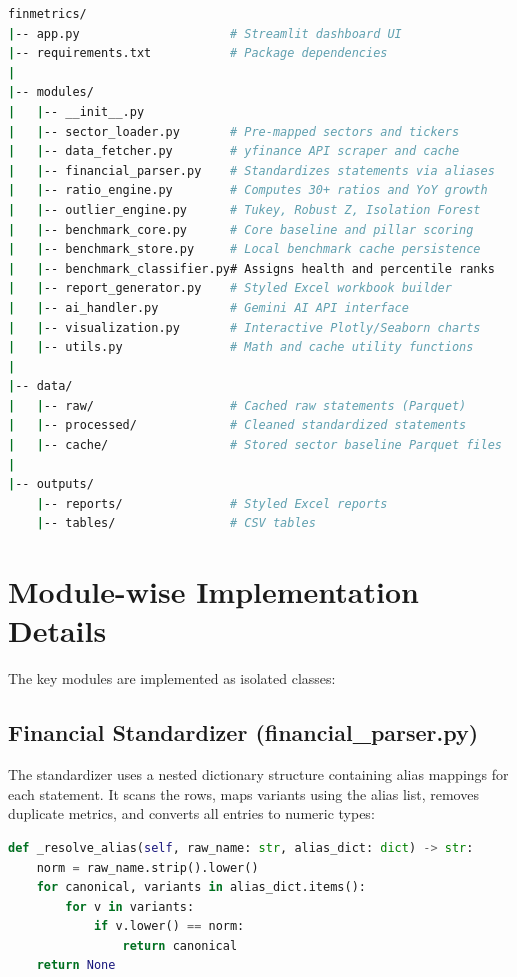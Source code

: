 \begin{lstlisting}[language=bash, caption=FinMetrics Suite Folder Structure]
finmetrics/
|-- app.py                     # Streamlit dashboard UI
|-- requirements.txt           # Package dependencies
|
|-- modules/
|   |-- __init__.py
|   |-- sector_loader.py       # Pre-mapped sectors and tickers
|   |-- data_fetcher.py        # yfinance API scraper and cache
|   |-- financial_parser.py    # Standardizes statements via aliases
|   |-- ratio_engine.py        # Computes 30+ ratios and YoY growth
|   |-- outlier_engine.py      # Tukey, Robust Z, Isolation Forest
|   |-- benchmark_core.py      # Core baseline and pillar scoring
|   |-- benchmark_store.py     # Local benchmark cache persistence
|   |-- benchmark_classifier.py# Assigns health and percentile ranks
|   |-- report_generator.py    # Styled Excel workbook builder
|   |-- ai_handler.py          # Gemini AI API interface
|   |-- visualization.py       # Interactive Plotly/Seaborn charts
|   |-- utils.py               # Math and cache utility functions
|
|-- data/
|   |-- raw/                   # Cached raw statements (Parquet)
|   |-- processed/             # Cleaned standardized statements
|   |-- cache/                 # Stored sector baseline Parquet files
|
|-- outputs/
    |-- reports/               # Styled Excel reports
    |-- tables/                # CSV tables
\end{lstlisting}

\section{Module-wise Implementation Details}
The key modules are implemented as isolated classes:

\subsection{Financial Standardizer (financial\_parser.py)}
The standardizer uses a nested dictionary structure containing alias mappings for each statement. It scans the rows, maps variants using the alias list, removes duplicate metrics, and converts all entries to numeric types:
\begin{lstlisting}[language=python, caption=Alias Resolver in FinancialParser]
def _resolve_alias(self, raw_name: str, alias_dict: dict) -> str:
    norm = raw_name.strip().lower()
    for canonical, variants in alias_dict.items():
        for v in variants:
            if v.lower() == norm:
                return canonical
    return None
\end{lstlisting}

